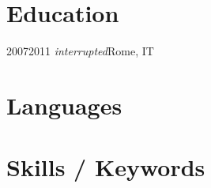 \documentclass{resume}
\begin{document}
\section{Education}

\begin{cvsection}
        {2007}{2011 \lbrack \textit{interrupted}\rbrack}{Rome, IT}{}
\end{cvsection}

\section{Languages}

\begin{languagessection}
\end{languagessection}

\section{Skills / Keywords}
\end{document}
